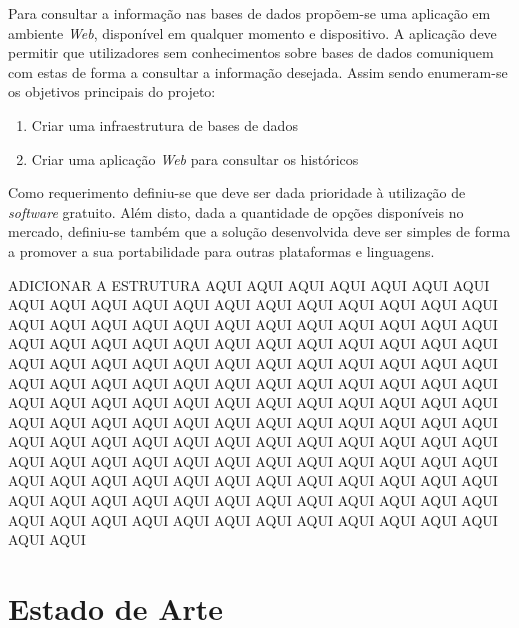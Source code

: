 \documentclass[11pt,twoside,a4paper]{report}
\begin{document}
Para consultar a informação nas bases de dados propõem-se uma aplicação em ambiente \textit{Web}, disponível em qualquer momento e dispositivo. A aplicação deve permitir que utilizadores sem conhecimentos sobre bases de dados comuniquem com estas de forma a consultar a informação desejada. Assim sendo enumeram-se os objetivos principais do projeto:
\begin{enumerate}
	\item Criar uma infraestrutura de bases de dados
	\item Criar uma aplicação \textit{Web} para consultar os históricos
\end{enumerate}
Como requerimento definiu-se que deve ser dada prioridade à utilização de \textit{software} gratuito. Além disto, dada a quantidade de opções disponíveis no mercado, definiu-se também que a solução desenvolvida deve ser simples de forma a promover a sua portabilidade para outras plataformas e linguagens.\par 
ADICIONAR A ESTRUTURA AQUI AQUI AQUI AQUI AQUI AQUI AQUI AQUI AQUI AQUI AQUI AQUI AQUI AQUI AQUI AQUI AQUI AQUI AQUI AQUI AQUI AQUI AQUI AQUI AQUI AQUI AQUI AQUI AQUI AQUI AQUI AQUI AQUI AQUI AQUI AQUI AQUI AQUI AQUI AQUI AQUI AQUI AQUI AQUI AQUI AQUI AQUI AQUI AQUI AQUI AQUI AQUI AQUI AQUI AQUI AQUI AQUI AQUI AQUI AQUI AQUI AQUI AQUI AQUI AQUI AQUI AQUI AQUI AQUI AQUI AQUI AQUI AQUI AQUI AQUI AQUI AQUI AQUI AQUI AQUI AQUI AQUI AQUI AQUI AQUI AQUI AQUI AQUI AQUI AQUI AQUI AQUI AQUI AQUI AQUI AQUI AQUI AQUI AQUI AQUI AQUI AQUI AQUI AQUI AQUI AQUI AQUI AQUI AQUI AQUI AQUI AQUI AQUI AQUI AQUI AQUI AQUI AQUI AQUI AQUI AQUI AQUI AQUI AQUI AQUI AQUI AQUI AQUI AQUI AQUI AQUI AQUI AQUI AQUI AQUI AQUI AQUI AQUI AQUI AQUI AQUI AQUI AQUI AQUI AQUI AQUI AQUI AQUI AQUI AQUI AQUI AQUI AQUI

\cleardoublepage
\chapter{Estado de Arte}
\end{document}
